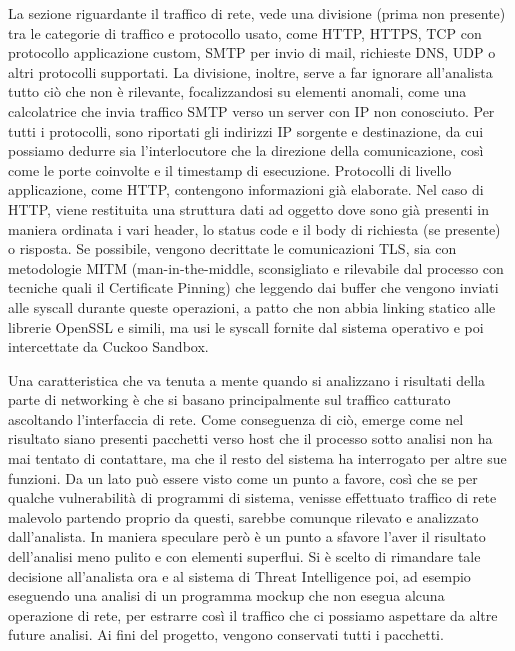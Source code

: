 La sezione riguardante il traffico di rete, vede una divisione (prima non presente) tra le categorie di traffico e protocollo usato, come HTTP, HTTPS, TCP con protocollo applicazione custom, SMTP per invio di mail, richieste DNS, UDP o altri protocolli supportati. La divisione, inoltre, serve a far ignorare all'analista tutto ciò che non è rilevante, focalizzandosi su elementi anomali, come una calcolatrice che invia traffico SMTP verso un server con IP non conosciuto.
Per tutti i protocolli, sono riportati gli indirizzi IP sorgente e destinazione, da cui possiamo dedurre sia l'interlocutore che la direzione della comunicazione, così come le porte coinvolte e il timestamp di esecuzione.
Protocolli di livello applicazione, come HTTP, contengono informazioni già elaborate. Nel caso di HTTP, viene restituita una struttura dati ad oggetto dove sono già presenti in maniera ordinata i vari header, lo status code e il body di richiesta (se presente) o risposta.
Se possibile, vengono decrittate le comunicazioni TLS, sia con metodologie MITM (man-in-the-middle, sconsigliato e rilevabile dal processo con tecniche quali il Certificate Pinning) che leggendo dai buffer che vengono inviati alle syscall durante queste operazioni, a patto che non abbia linking statico alle librerie OpenSSL e simili, ma usi le syscall fornite dal sistema operativo e poi intercettate da Cuckoo Sandbox.

Una caratteristica che va tenuta a mente quando si analizzano i risultati della parte di networking è che si basano principalmente sul traffico catturato ascoltando l'interfaccia di rete. Come conseguenza di ciò, emerge come nel risultato siano presenti pacchetti verso host che il processo sotto analisi non ha mai tentato di contattare, ma che il resto del sistema ha interrogato per altre sue funzioni.
Da un lato può essere visto come un punto a favore, così che se per qualche vulnerabilità di programmi di sistema, venisse effettuato traffico di rete malevolo partendo proprio da questi, sarebbe comunque rilevato e analizzato dall'analista. In maniera speculare però è un punto a sfavore l'aver il risultato dell'analisi meno pulito e con elementi superflui.
Si è scelto di rimandare tale decisione all'analista ora e al sistema di Threat Intelligence poi, ad esempio eseguendo una analisi di un programma mockup che non esegua alcuna operazione di rete, per estrarre così il traffico che ci possiamo aspettare da altre future analisi. Ai fini del progetto, vengono conservati tutti i pacchetti.


